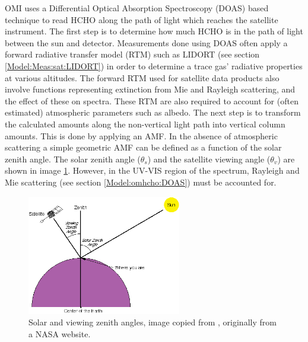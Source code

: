   OMI uses a Differential Optical Absorption Spectroscopy (DOAS) based technique to read HCHO along the path of light which reaches the satellite instrument.
  The first step is to determine how much HCHO is in the path of light between the sun and detector.
  Measurements done using DOAS often apply a forward radiative transfer model (RTM) such as LIDORT (see section \ref{Model:Meas:sat:LIDORT}) in order to determine a trace gas' radiative properties at various altitudes.
  The forward RTM used for satellite data products also involve functions representing extinction from Mie and Rayleigh scattering, and the effect of these on spectra.
  These RTM are also required to account for (often estimated) atmospheric parameters such as albedo.
  The next step is to transform the calculated amounts along the non-vertical light path into vertical column amounts.
  This is done by applying an AMF.
  In the absence of atmospheric scattering a simple geometric AMF can be defined as a function of the solar zenith angle. 
  The solar zenith angle ($\theta_s$) and the satellite viewing angle ($\theta_v$) are shown in image \ref{ch_HCHO:fig:zenithangle}.
  However, in the UV-VIS region of the spectrum, Rayleigh and Mie scattering (see section \ref{Model:omhcho:DOAS}) must be accounted for.
  
  
  \begin{figure}\begin{center}
      \includegraphics[width=0.6\textwidth]{Figures/ZenithAngles.png}
      \caption{Solar and viewing zenith angles, image copied from \textcite{SZA_Image}, originally from a NASA website.}
      \label{ch_HCHO:fig:zenithangle}
    \end{center}\end{figure}
  
